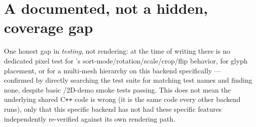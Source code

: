 \section{A documented, not a hidden, coverage gap}

One honest gap in \emph{testing}, not rendering: at the time of writing there is no dedicated
pixel test for 's sort-mode/rotation/scale/crop/flip behavior, for
 glyph placement, or for a multi-mesh  hierarchy on this
backend specifically --- confirmed by directly searching the test suite for matching test
names and finding none, despite basic /2D-demo smoke tests passing.
This does not mean the underlying shared C\texttt{++} code is wrong (it is the same code
every other backend runs), only that this specific backend has not had these specific
features independently re-verified against its own rendering path.
